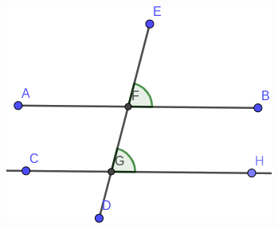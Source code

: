 \begin{minipage}{0.45\textwidth}
    \begin{figure}[H]
        \centering
        \includegraphics[width=\linewidth]{../images/ang_correspond01}





        \caption{}
        \label{fig:ang_correspond01}
    \end{figure}
\end{minipage}
